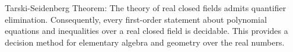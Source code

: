 Tarski-Seidenberg Theorem: The theory of real closed fields admits quantifier elimination. Consequently, every first-order statement about polynomial equations and inequalities over a real closed field is decidable. This provides a decision method for elementary algebra and geometry over the real numbers.
